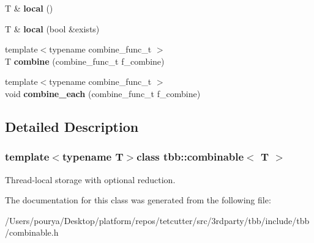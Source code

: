 \begin{DoxyCompactItemize}
\item 
\hypertarget{classtbb_1_1combinable_ae47f982dbd396d225f0f546e60690d42}{}T \& {\bfseries local} ()\label{classtbb_1_1combinable_ae47f982dbd396d225f0f546e60690d42}

\item 
\hypertarget{classtbb_1_1combinable_a2433d2b3b53b9979d0b3bb2a175abc9b}{}T \& {\bfseries local} (bool \&exists)\label{classtbb_1_1combinable_a2433d2b3b53b9979d0b3bb2a175abc9b}

\item 
\hypertarget{classtbb_1_1combinable_a3d564f6d480e0c7fe8e756d1de1cf0e2}{}{\footnotesize template$<$typename combine\+\_\+func\+\_\+t $>$ }\\T {\bfseries combine} (combine\+\_\+func\+\_\+t f\+\_\+combine)\label{classtbb_1_1combinable_a3d564f6d480e0c7fe8e756d1de1cf0e2}

\item 
\hypertarget{classtbb_1_1combinable_aadadee714004d977f0e95a479bfb80ac}{}{\footnotesize template$<$typename combine\+\_\+func\+\_\+t $>$ }\\void {\bfseries combine\+\_\+each} (combine\+\_\+func\+\_\+t f\+\_\+combine)\label{classtbb_1_1combinable_aadadee714004d977f0e95a479bfb80ac}

\end{DoxyCompactItemize}


\subsection{Detailed Description}
\subsubsection*{template$<$typename T$>$class tbb\+::combinable$<$ T $>$}

Thread-\/local storage with optional reduction. 



The documentation for this class was generated from the following file\+:\begin{DoxyCompactItemize}
\item 
/\+Users/pourya/\+Desktop/platform/repos/tetcutter/src/3rdparty/tbb/include/tbb/combinable.\+h\end{DoxyCompactItemize}
